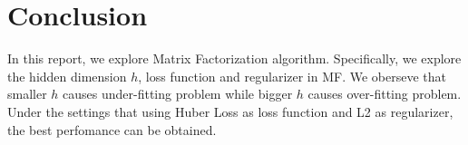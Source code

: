 \documentclass[journal, a4paper]{IEEEtran}
\begin{document}
\section{Conclusion}
In this report, we explore Matrix Factorization algorithm. Specifically, we explore the hidden dimension $h$, loss function and regularizer in MF. We oberseve that smaller $h$ causes under-fitting problem while bigger $h$ causes over-fitting problem. Under the settings that using Huber Loss as loss function and L2 as regularizer, the best perfomance can be obtained.   \par


\end{document}
